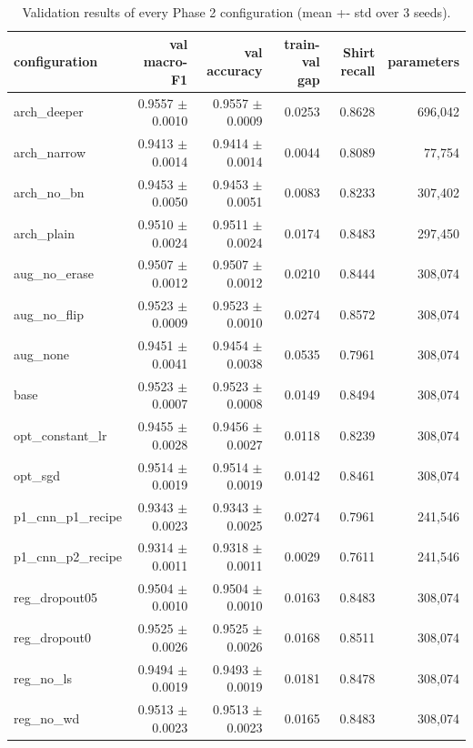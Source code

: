 \begin{table}[t]
\centering
\caption{Validation results of every Phase 2 configuration (mean +- std over 3 seeds).}
\label{tab:p2_ablation_summary}
\footnotesize
\begin{tabular}{lrrrrr}
\toprule
configuration & val macro-F1 & val accuracy & train-val gap & Shirt recall & parameters \\
\midrule
arch\_deeper & 0.9557 $\pm$ 0.0010 & 0.9557 $\pm$ 0.0009 & 0.0253 & 0.8628 & 696,042 \\
arch\_narrow & 0.9413 $\pm$ 0.0014 & 0.9414 $\pm$ 0.0014 & 0.0044 & 0.8089 & 77,754 \\
arch\_no\_bn & 0.9453 $\pm$ 0.0050 & 0.9453 $\pm$ 0.0051 & 0.0083 & 0.8233 & 307,402 \\
arch\_plain & 0.9510 $\pm$ 0.0024 & 0.9511 $\pm$ 0.0024 & 0.0174 & 0.8483 & 297,450 \\
aug\_no\_erase & 0.9507 $\pm$ 0.0012 & 0.9507 $\pm$ 0.0012 & 0.0210 & 0.8444 & 308,074 \\
aug\_no\_flip & 0.9523 $\pm$ 0.0009 & 0.9523 $\pm$ 0.0010 & 0.0274 & 0.8572 & 308,074 \\
aug\_none & 0.9451 $\pm$ 0.0041 & 0.9454 $\pm$ 0.0038 & 0.0535 & 0.7961 & 308,074 \\
base & 0.9523 $\pm$ 0.0007 & 0.9523 $\pm$ 0.0008 & 0.0149 & 0.8494 & 308,074 \\
opt\_constant\_lr & 0.9455 $\pm$ 0.0028 & 0.9456 $\pm$ 0.0027 & 0.0118 & 0.8239 & 308,074 \\
opt\_sgd & 0.9514 $\pm$ 0.0019 & 0.9514 $\pm$ 0.0019 & 0.0142 & 0.8461 & 308,074 \\
p1\_cnn\_p1\_recipe & 0.9343 $\pm$ 0.0023 & 0.9343 $\pm$ 0.0025 & 0.0274 & 0.7961 & 241,546 \\
p1\_cnn\_p2\_recipe & 0.9314 $\pm$ 0.0011 & 0.9318 $\pm$ 0.0011 & 0.0029 & 0.7611 & 241,546 \\
reg\_dropout05 & 0.9504 $\pm$ 0.0010 & 0.9504 $\pm$ 0.0010 & 0.0163 & 0.8483 & 308,074 \\
reg\_dropout0 & 0.9525 $\pm$ 0.0026 & 0.9525 $\pm$ 0.0026 & 0.0168 & 0.8511 & 308,074 \\
reg\_no\_ls & 0.9494 $\pm$ 0.0019 & 0.9493 $\pm$ 0.0019 & 0.0181 & 0.8478 & 308,074 \\
reg\_no\_wd & 0.9513 $\pm$ 0.0023 & 0.9513 $\pm$ 0.0023 & 0.0165 & 0.8483 & 308,074 \\
\bottomrule
\end{tabular}
\end{table}
